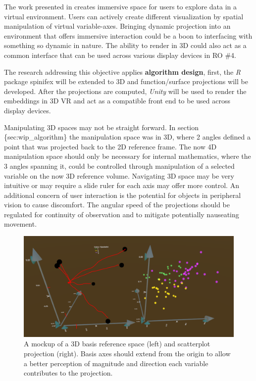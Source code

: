 \documentclass{monashthesis}
\begin{document}
The work presented in \textcite{cordeil_imaxes:_2017} creates immersive
space for users to explore data in a virtual environment. Users can
actively create different visualization by spatial manipulation of
virtual variable-axes. Bringing dynamic projection into an environment
that offers immersive interaction could be a boon to interfacing with
something so dynamic in nature. The ability to render in 3D could also
act as a common interface that can be used across various display
devices in RO \#4.

The research addressing this objective applies \textbf{algorithm
design}, first, the \emph{R} package spinifex will be extended to 3D and
function/surface projections will be developed. After the projections
are computed, \emph{Unity} will be used to render the embeddings in 3D
VR and act as a compatible front end to be used across display devices.

Manipulating 3D spaces may not be straight forward. In section
\{sec:wip\_algorithm\} the manipulation space was in 3D, where 2 angles
defined a point that was projected back to the 2D reference frame. The
now 4D manipulation space should only be necessary for internal
mathematics, where the 3 angles spanning it, could be controlled through
manipulation of a selected variable on the now 3D reference volume.
Navigating 3D space may be very intuitive or may require a slide ruler
for each axis may offer more control. An additional concern of user
interaction is the potential for objects in peripheral vision to cause
discomfort. The angular speed of the projections should be regulated for
continuity of observation and to mitigate potentially nauseating
movement.






\begin{figure}

{\centering \includegraphics[width=0.7\linewidth]{./figures/RO3MockUp2} 

}

\caption{A mockup of a 3D basis reference space (left) and
scatterplot projection (right). Basis axes should extend from the origin
to allow a better perception of magnitude and direction each variable
contributes to the projection.}\label{fig:RO3MockUp}
\end{figure}
\end{document}
